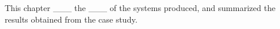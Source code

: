 This chapter ___ the ___ of the systems produced, and summarized the results obtained from the case study.